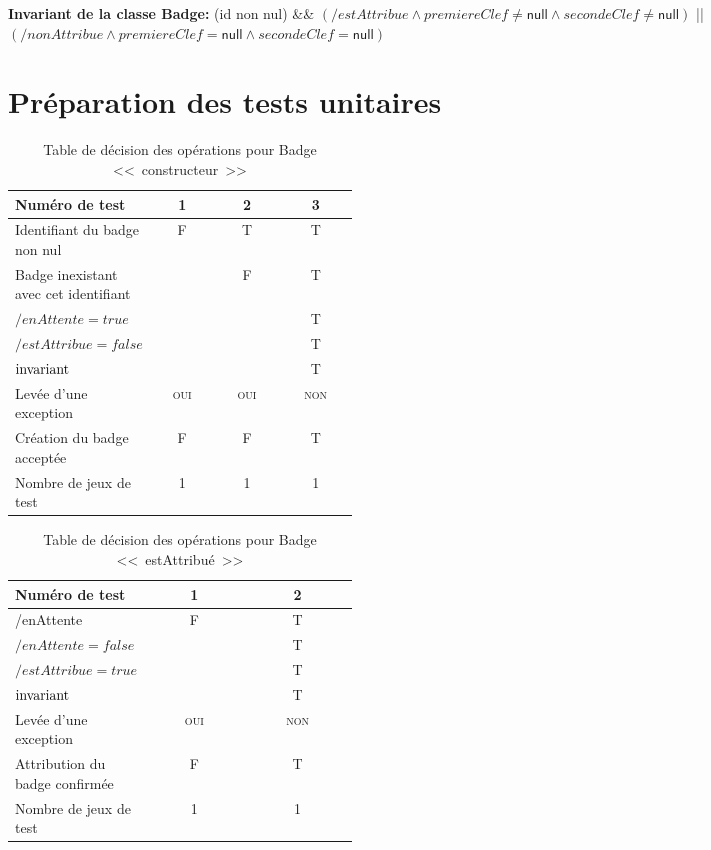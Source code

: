 \documentclass[11pt,article]{article}
\newcommand{\nullvalue}{\textsf{null}\xspace}
\newcommand{\invariant}{\ensuremath\mathrm{invariant}}
\begin{document}
\textbf{Invariant de la classe Badge:} (id non nul) \&\& $(/estAttribue \land premiereClef \neq \nullvalue \land secondeClef \neq \nullvalue)$  || $(/nonAttribue \land premiereClef = \nullvalue \land secondeClef = \nullvalue)$

\newpage

\section{Préparation des tests unitaires}

\begin{table}[!ht]
\begin{center}
\begin{tabular}{|p{0.4\linewidth}|c|c|c|}
\hline
Numéro de test
&1&2&3\\
\hline
\hline
Identifiant du badge non nul
&F&T&T\\
\hline
Badge inexistant avec cet identifiant
& &F&T\\
\hline
\hline
$/enAttente = true$
& & &T\\
\hline
$/estAttribue = false$
& & &T\\
\hline
$\invariant$
& & &T\\
\hline
Levée d'une exception&\textsc{oui}&\textsc{oui}&\textsc{non}\\
\hline
\hline
Création du badge acceptée
&F&F&T\\
\hline
\hline
Nombre de jeux de test
&1&1&1\\
\hline
\end{tabular}
\end{center}
\caption{Table de décision des opérations pour Badge <<~constructeur~>>}
\end{table}

\begin{table}[!ht]
\begin{center}
\begin{tabular}{|p{0.4\linewidth}|c|c|}
\hline
Numéro de test
&1&2\\
\hline
\hline
/enAttente
&F&T\\
\hline
\hline
$/enAttente = false$
& &T\\
\hline
$/estAttribue = true$
& &T\\
\hline
$\invariant$
& &T\\
\hline
Levée d'une exception&\textsc{oui}&\textsc{non}\\
\hline
\hline
Attribution du badge confirmée
&F&T\\
\hline
\hline
Nombre de jeux de test
&1&1\\
\hline
\end{tabular}
\end{center}
\caption{Table de décision des opérations pour Badge <<~estAttribué~>>}
\end{table}
\end{document}
